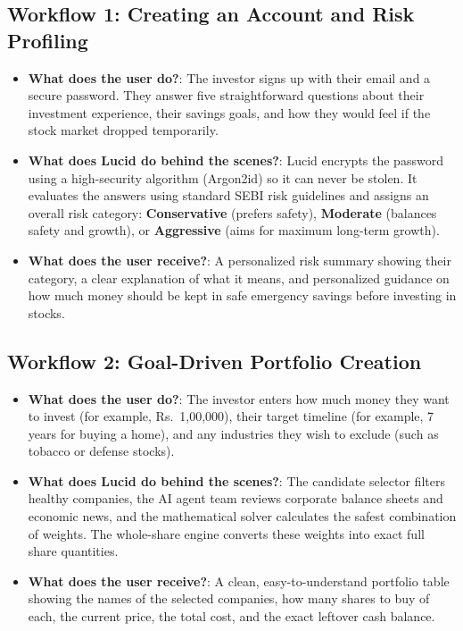 \subsection{Workflow 1: Creating an Account and Risk Profiling}
\begin{itemize}
    \item \textbf{What does the user do?}: The investor signs up with their email and a secure password. They answer five straightforward questions about their investment experience, their savings goals, and how they would feel if the stock market dropped temporarily.
    \item \textbf{What does Lucid do behind the scenes?}: Lucid encrypts the password using a high-security algorithm (Argon2id) so it can never be stolen. It evaluates the answers using standard SEBI risk guidelines and assigns an overall risk category: \textbf{Conservative} (prefers safety), \textbf{Moderate} (balances safety and growth), or \textbf{Aggressive} (aims for maximum long-term growth).
    \item \textbf{What does the user receive?}: A personalized risk summary showing their category, a clear explanation of what it means, and personalized guidance on how much money should be kept in safe emergency savings before investing in stocks.
\end{itemize}

\subsection{Workflow 2: Goal-Driven Portfolio Creation}
\begin{itemize}
    \item \textbf{What does the user do?}: The investor enters how much money they want to invest (for example, Rs.~1,00,000), their target timeline (for example, 7 years for buying a home), and any industries they wish to exclude (such as tobacco or defense stocks).
    \item \textbf{What does Lucid do behind the scenes?}: The candidate selector filters healthy companies, the AI agent team reviews corporate balance sheets and economic news, and the mathematical solver calculates the safest combination of weights. The whole-share engine converts these weights into exact full share quantities.
    \item \textbf{What does the user receive?}: A clean, easy-to-understand portfolio table showing the names of the selected companies, how many shares to buy of each, the current price, the total cost, and the exact leftover cash balance.
\end{itemize}

